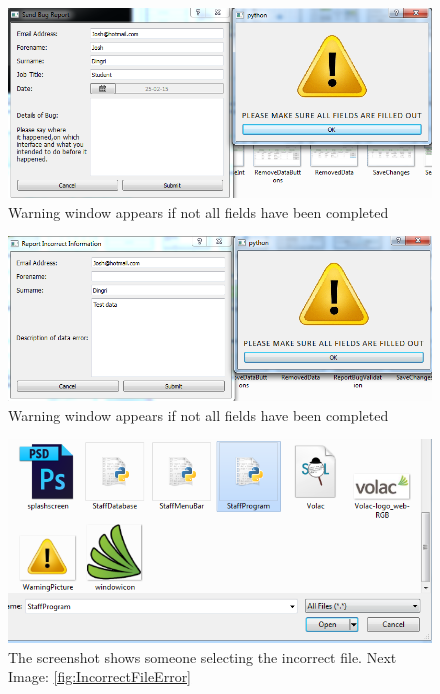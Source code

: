 \begin{figure}[H]
    \includegraphics[width=\textwidth]{./Testing/Images/ReportBugValidation.png}
    \caption{Warning window appears if not all fields have been completed} \label{fig:ReportBugValidation}
\end{figure}

\begin{figure}[H]
    \includegraphics[width=\textwidth]{./Testing/Images/ReportErrorValidation.png}
    \caption{Warning window appears if not all fields have been completed} \label{fig:ReportErrorValidation}
\end{figure}

\begin{figure}[H]
    \includegraphics[width=\textwidth]{./Testing/Images/IncorrectFile.png}
    \caption{The screenshot shows someone selecting the incorrect file. Next Image: \ref{fig:IncorrectFileError}} \label{fig:IncorrectFile}
\end{figure}

